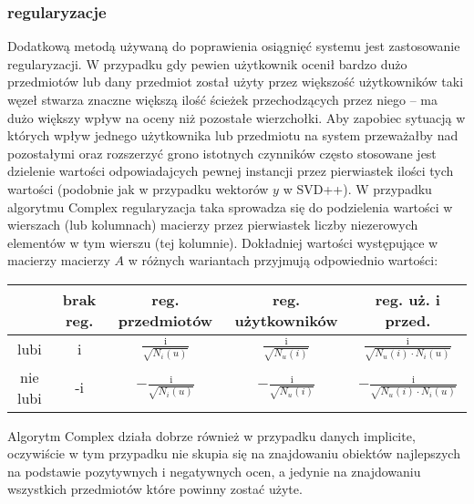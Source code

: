 \documentclass{pracamgr}
\begin{document}
    \subsubsection{regularyzacje}
     Dodatkową metodą używaną do poprawienia osiągnięć systemu jest zastosowanie regularyzacji.
     W przypadku gdy pewien użytkownik ocenił bardzo dużo przedmiotów lub dany przedmiot został użyty przez większość użytkowników taki węzeł
     stwarza znaczne większą ilość ścieżek przechodzących przez niego -- ma dużo większy wpływ na oceny niż pozostałe wierzchołki.
     Aby zapobiec sytuacją w których wpływ jednego użytkownika lub przedmiotu na system przeważałby nad pozostałymi oraz rozszerzyć
     grono istotnych czynników często stosowane jest dzielenie wartości odpowiadajcych pewnej instancji przez pierwiastek ilości tych wartości
     (podobnie jak w przypadku wektorów $y$ w SVD++).
     W przypadku algorytmu Complex regularyzacja taka sprowadza się do podzielenia wartości w wierszach (lub kolumnach) macierzy przez pierwiastek liczby
     niezerowych elementów w tym wierszu (tej kolumnie). Dokładniej wartości występujące w macierzy macierzy $A$ w różnych wariantach przyjmują odpowiednio
     wartości:
     \begin{center}
      \begin{tabular}{|c|c|c|c|c|}
       \hline
         & brak reg. & reg. przedmiotów & reg. użytkowników & reg. uż. i przed. \\
       \hline
        lubi & i &  $\frac{\text{i}}{\sqrt{N_{i}(u)}}$& $\frac{\text{i}}{\sqrt{N_{u}(i)}}$ & $\frac{\text{i}}{\sqrt{N_{u}(i)\cdot N_{i}(u)}}$  \\
       \hline
        nie lubi & -i & $-\frac{\text{i}}{\sqrt{N_{i}(u)}}$ &  $-\frac{\text{i}}{\sqrt{N_{u}(i)}}$ & $-\frac{\text{i}}{\sqrt{N_{u}(i)\cdot N_{i}(u)}}$  \\    
       \hline
      \end{tabular}
     \end{center}
     \vspace{16pt}
     Algorytm Complex działa dobrze również w przypadku danych implicite, oczywiście w tym przypadku nie skupia się na znajdowaniu obiektów najlepszych
     na podstawie pozytywnych i negatywnych ocen, a jedynie na znajdowaniu wszystkich przedmiotów które powinny zostać użyte.\newpage
    
    
    
\end{document}
